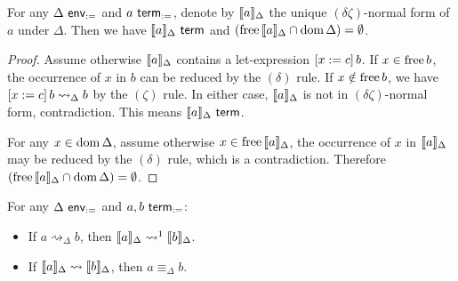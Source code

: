 \documentclass[twoside]{report}
\begin{document}
\begin{proposition}[Projection]
\label{thm:def_projection}
For any $\Delta \ \mathsf{env}_{:=}$ and $a \ \mathsf{term}_{:=}$, denote by $\llbracket{a}\rrbracket_\Delta$ the unique $(\delta\zeta)$-normal form of $a$ under $\Delta$. Then we have $\llbracket{a}\rrbracket_\Delta \ \mathsf{term}$ and $(\operatorname{free}{\llbracket{a}\rrbracket_\Delta} \cap \operatorname{dom} \Delta) = \emptyset$.
\end{proposition}

\begin{proof}
Assume otherwise $\llbracket{a}\rrbracket_\Delta$ contains a let-expression $[{x}:={c}]\,{b}$. If $x \in \operatorname{free} b$, the occurrence of $x$ in $b$ can be reduced by the $(\delta)$ rule. If $x \notin \operatorname{free} b$, we have $[{x}:={c}]\,{b} \rightsquigarrow_\Delta b$ by the $(\zeta)$ rule. In either case, $\llbracket{a}\rrbracket_\Delta$ is not in $(\delta\zeta)$-normal form, contradiction. This means $\llbracket{a}\rrbracket_\Delta \ \mathsf{term}$.

For any $x \in \operatorname{dom} \Delta$, assume otherwise $x \in \operatorname{free}{\llbracket{a}\rrbracket_\Delta}$, the occurrence of $x$ in $\llbracket{a}\rrbracket_\Delta$ may be reduced by the $(\delta)$ rule, which is a contradiction. Therefore $(\operatorname{free}{\llbracket{a}\rrbracket_\Delta} \cap \operatorname{dom} \Delta) = \emptyset$.
\end{proof}

\begin{proposition}[Equivalence]
\label{thm:def_defeq_equivalence}
For any $\Delta \ \mathsf{env}_{:=}$ and $a, b \ \mathsf{term}_{:=}$:
\begin{itemize}[noitemsep]
    \item If $a \rightsquigarrow_\Delta b$, then $\llbracket{a}\rrbracket_\Delta \rightsquigarrow^1 \llbracket{b}\rrbracket_\Delta$.
    \item If $\llbracket{a}\rrbracket_\Delta \rightsquigarrow \llbracket{b}\rrbracket_\Delta$, then $a \equiv_\Delta b$.
\end{itemize}
\end{proposition}
\end{document}

